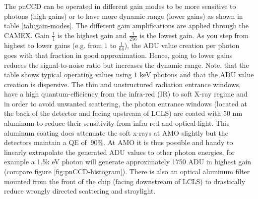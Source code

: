 The pnCCD can be operated in different gain modes to be more sensitive to photons (high gains) or to have more dynamic range (lower gains) as shown in table \ref{tab:gain-modes}. The different gain amplifications are applied through the CAMEX. Gain $\frac{1}{1}$ is the highest gain and $\frac{1}{256}$ is the lowest gain. As you step from highest to lower gains (e.g. from $1$ to $\frac{1}{64}$), the ADU value creation per photon goes with that fraction in good approximation. Hence, going to lower gains reduces the signal-to-noise ratio but increases the dynamic range. Note, that the table shows typical operating values using $1$ keV photons and that the ADU value creation is dispersive. The thin and unstructured radiation entrance windows, have a high quantum-efficiency from the infra-red (IR) to soft X-ray regime and in order to avoid unwanted scattering, the photon entrance windows (located at the back of the detector and facing upstream of LCLS) are coated with 50 nm aluminum to reduce their sensitivity from infra-red and optical light. This aluminum coating does attenuate the soft x-rays at AMO slightly but the detectors maintain a QE of $~90\%$. At AMO it is thus possible and handy to linearly extrapolate the generated ADU values to other photon energies, for example a 1.5k eV photon will generate approximately 1750 ADU in highest gain (compare figure \ref{fig:pnCCD-histogram}). There is also an optical aluminum filter mounted from the front of the chip (facing downstream of LCLS) to drastically reduce wrongly directed scattering and straylight.
%
%
%
